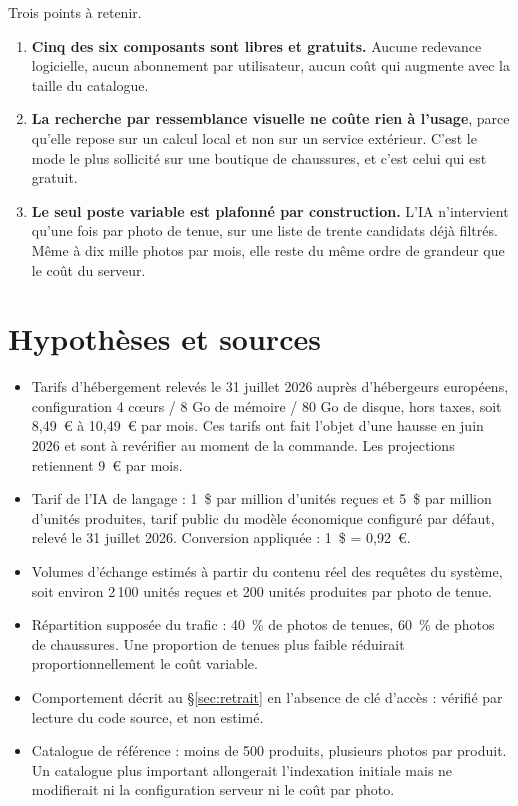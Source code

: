 \documentclass[11pt,a4paper]{article}
\begin{document}
Trois points à retenir.

\begin{enumerate}
  \item \textbf{Cinq des six composants sont libres et gratuits.} Aucune
  redevance logicielle, aucun abonnement par utilisateur, aucun coût qui
  augmente avec la taille du catalogue.

  \item \textbf{La recherche par ressemblance visuelle ne coûte rien à
  l'usage}, parce qu'elle repose sur un calcul local et non sur un service
  extérieur. C'est le mode le plus sollicité sur une boutique de chaussures, et
  c'est celui qui est gratuit.

  \item \textbf{Le seul poste variable est plafonné par construction.} L'IA
  n'intervient qu'une fois par photo de tenue, sur une liste de trente candidats
  déjà filtrés. Même à dix mille photos par mois, elle reste du même ordre de
  grandeur que le coût du serveur.
\end{enumerate}

\vspace{1.5em}
\section*{Hypothèses et sources}

{\small
\begin{itemize}
  \item Tarifs d'hébergement relevés le 31 juillet 2026 auprès d'hébergeurs
  européens, configuration 4 cœurs / 8 Go de mémoire / 80 Go de disque, hors
  taxes, soit 8,49~€ à 10,49~€ par mois. Ces tarifs ont fait l'objet d'une
  hausse en juin 2026 et sont à revérifier au moment de la commande. Les
  projections retiennent 9~€ par mois.

  \item Tarif de l'IA de langage : 1~\$ par million d'unités reçues et 5~\$ par
  million d'unités produites, tarif public du modèle économique configuré par
  défaut, relevé le 31 juillet 2026. Conversion appliquée : 1~\$ = 0,92~€.

  \item Volumes d'échange estimés à partir du contenu réel des requêtes du
  système, soit environ 2\,100 unités reçues et 200 unités produites par photo
  de tenue.

  \item Répartition supposée du trafic : 40~\% de photos de tenues, 60~\% de
  photos de chaussures. Une proportion de tenues plus faible réduirait
  proportionnellement le coût variable.

  \item Comportement décrit au §\ref{sec:retrait} en l'absence de clé d'accès :
  vérifié par lecture du code source, et non estimé.

  \item Catalogue de référence : moins de 500 produits, plusieurs photos par
  produit. Un catalogue plus important allongerait l'indexation initiale mais ne
  modifierait ni la configuration serveur ni le coût par photo.
\end{itemize}
}
\end{document}

